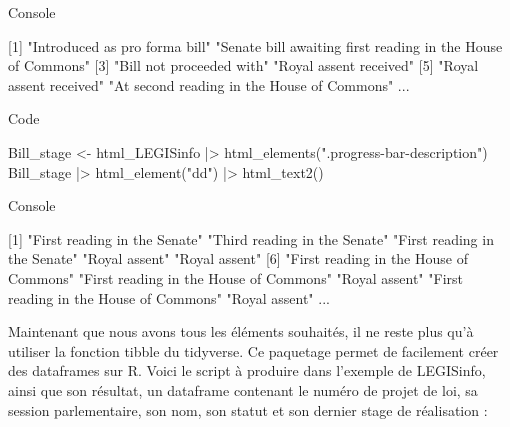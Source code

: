 \documentclass[
  letterpaper,
  DIV=11,
  numbers=noendperiod]{scrreprt}
\newenvironment{Shaded}{\begin{snugshade}}{\end{snugshade}}
\newcommand{\ExtensionTok}[1]{\textcolor[rgb]{0.00,0.23,0.31}{#1}}
\newcommand{\KeywordTok}[1]{\textcolor[rgb]{0.00,0.23,0.31}{#1}}
\newcommand{\NormalTok}[1]{\textcolor[rgb]{0.00,0.23,0.31}{#1}}
\newcommand{\OperatorTok}[1]{\textcolor[rgb]{0.37,0.37,0.37}{#1}}
\newcommand{\StringTok}[1]{\textcolor[rgb]{0.13,0.47,0.30}{#1}}
\begin{document}
Console

\begin{Shaded}
\begin{Highlighting}[]
\ExtensionTok{[1]} \StringTok{"Introduced as pro forma bill"}                                              \StringTok{"Senate bill awaiting first reading in the House of Commons"}               
 \ExtensionTok{[3]} \StringTok{"Bill not proceeded with"}                                                   \StringTok{"Royal assent received"}                                                    
 \ExtensionTok{[5]} \StringTok{"Royal assent received"}                                                     \StringTok{"At second reading in the House of Commons"}     
\ExtensionTok{...}
\end{Highlighting}
\end{Shaded}

Code

\begin{Shaded}
\begin{Highlighting}[]
\ExtensionTok{Bill\_stage} \OperatorTok{\textless{}}\NormalTok{{-} html\_LEGISinfo }\KeywordTok{|}\OperatorTok{\textgreater{}}\NormalTok{ html\_elements}\KeywordTok{(}\StringTok{".progress{-}bar{-}description"}\KeywordTok{)}
\ExtensionTok{Bill\_stage} \KeywordTok{|}\OperatorTok{\textgreater{}}\NormalTok{ html\_element}\KeywordTok{(}\StringTok{"dd"}\KeywordTok{)} \KeywordTok{|}\OperatorTok{\textgreater{}}\NormalTok{ html\_text2}\KeywordTok{()}
\end{Highlighting}
\end{Shaded}

Console

\begin{Shaded}
\begin{Highlighting}[]
\ExtensionTok{[1]} \StringTok{"First reading in the Senate"}            \StringTok{"Third reading in the Senate"}            \StringTok{"First reading in the Senate"}            \StringTok{"Royal assent"}                           \StringTok{"Royal assent"}                          
 \ExtensionTok{[6]} \StringTok{"First reading in the House of Commons"}  \StringTok{"First reading in the House of Commons"}  \StringTok{"Royal assent"}                           \StringTok{"First reading in the House of Commons"}  \StringTok{"Royal assent"}        
\ExtensionTok{...}
 
\end{Highlighting}
\end{Shaded}

Maintenant que nous avons tous les éléments souhaités, il ne reste plus
qu'à utiliser la fonction tibble du tidyverse. Ce paquetage permet de
facilement créer des dataframes sur R. Voici le script à produire dans
l'exemple de LEGISinfo, ainsi que son résultat, un dataframe contenant
le numéro de projet de loi, sa session parlementaire, son nom, son
statut et son dernier stage de réalisation :
\end{document}

